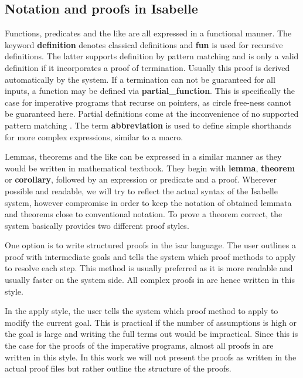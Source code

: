 \subsection{Notation and proofs in Isabelle}

Functions, predicates and the like are all expressed in
a functional manner.
The keyword \textbf{definition} denotes classical definitions
and \textbf{fun} is used for recursive definitions.
The latter supports definition by pattern matching and
is only a valid definition if it incorporates a proof of termination.
Usually this proof is derived automatically by the system.
If a termination can not be guaranteed for all inputs,
a function may be defined via \textbf{partial\_function}.
This is specifically the case for imperative programs
that recurse on pointers, as circle free-ness cannot be guaranteed here.
Partial definitions come at the inconvenience of no
supported pattern matching \parencite{isabelleManual}.
The term \textbf{abbreviation} is used to define simple shorthands for more complex expressions,
similar to a macro.

Lemmas, theorems and the like can be expressed in a similar manner
as they would be written in mathematical textbook.
They begin with \textbf{lemma}, \textbf{theorem} or \textbf{corollary},
followed by an expression or predicate and a proof.
Wherever possible and readable, we will try to reflect the actual
syntax of the Isabelle system, however compromise in order to
keep the notation of obtained lemmata and theorems
close to conventional notation.
To prove a theorem correct, the system basically provides two different
proof styles.

One option is to write structured proofs in the isar language.
The user outlines a proof with intermediate goals
and tells the system which proof methods to apply to
resolve each step.
This method is usually preferred as it is more readable and usually
faster on the system side.
All complex proofs in  are hence written in this style.

In the apply style, the user tells the system which proof method
to apply to modify the current goal.
This is practical if the number of assumptions
is high or the goal is large and writing the full terms
out would be impractical.
Since this is the case for the proofs of the imperative programs,
almost all proofs in  are written in this style.
In this work we will not present the proofs as written in the actual
proof files but rather outline the structure of the proofs.

